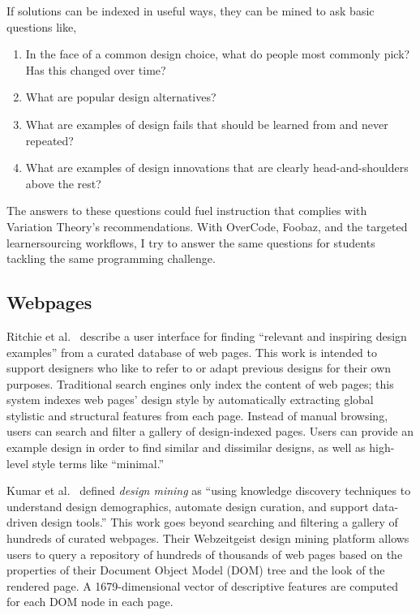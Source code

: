 If solutions can be indexed in useful ways, they can be mined to ask basic questions like,
\begin{enumerate}
\item    In the face of a common design choice, what do people most commonly pick? Has this changed over time?
\item    What are popular design alternatives?
\item    What are examples of design fails that should be learned from and never repeated?
\item    What are examples of design innovations that are clearly head-and-shoulders above the rest?
\end{enumerate}
The answers to these questions could fuel instruction that complies with Variation Theory's recommendations. With OverCode, Foobaz, and the targeted learnersourcing workflows, I try to answer the same questions for students tackling the same programming challenge.

\subsection{Webpages}
Ritchie et al.~\cite{ritchie2011d} describe a user interface for finding ``relevant and inspiring design examples'' from a curated database of web pages. This work is intended to support designers who like to refer to or adapt previous designs for their own purposes. Traditional search engines only index the content of web pages; this system indexes web pages’ design style by automatically extracting global stylistic and structural features from each page. Instead of manual browsing, users can search and filter a gallery of design-indexed pages. Users can provide an example design in order to find similar and dissimilar designs, as well as high-level style terms like ``minimal.''

Kumar et al.~\cite{webzeitgeist} defined {\it design mining} as ``using knowledge discovery techniques to understand design demographics, automate design curation, and support data-driven design tools.'' This work goes beyond searching and filtering a gallery of hundreds of curated webpages. Their Webzeitgeist design mining platform allows users to query a repository of hundreds of thousands of web pages based on the properties of their Document Object Model (DOM) tree and the look of the rendered page. A 1679-dimensional vector of descriptive features are computed for each DOM node in each page.

